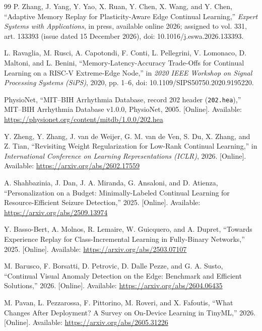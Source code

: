 \begin{thebibliography}{99}
P. Zhang, J. Yang, Y. Yao, X. Ruan, Y. Chen, X. Wang, and Y. Chen,
``Adaptive Memory Replay for Plasticity-Aware Edge Continual Learning,''
\emph{Expert Systems with Applications}, in press, available online 2026;
assigned to vol. 331, art. 133393 (issue dated 15 December 2026),
doi: 10.1016/j.eswa.2026.133393.

L. Ravaglia, M. Rusci, A. Capotondi, F. Conti, L. Pellegrini, V. Lomonaco,
D. Maltoni, and L. Benini,
``Memory-Latency-Accuracy Trade-Offs for Continual Learning on a RISC-V
Extreme-Edge Node,'' in \emph{2020 IEEE Workshop on Signal Processing Systems
(SiPS)}, 2020, pp. 1--6, doi: 10.1109/SIPS50750.2020.9195220.

PhysioNet, ``MIT--BIH Arrhythmia Database, record 202 header (\texttt{202.hea}),''
MIT--BIH Arrhythmia Database v1.0.0, PhysioNet, 2005.
[Online]. Available: \url{https://physionet.org/content/mitdb/1.0.0/202.hea}

Y. Zheng, Y. Zhang, J. van de Weijer, G. M. van de Ven, S. Du, X. Zhang, and
Z. Tian, ``Revisiting Weight Regularization for Low-Rank Continual Learning,''
in \emph{International Conference on Learning Representations (ICLR)}, 2026.
[Online]. Available: \url{https://arxiv.org/abs/2602.17559}

A. Shahbazinia, J. Dan, J. A. Miranda, G. Ansaloni, and D. Atienza,
``Personalization on a Budget: Minimally-Labeled Continual Learning for
Resource-Efficient Seizure Detection,'' 2025.
[Online]. Available: \url{https://arxiv.org/abs/2509.13974}

Y. Basso-Bert, A. Molnos, R. Lemaire, W. Guicquero, and A. Dupret,
``Towards Experience Replay for Class-Incremental Learning in Fully-Binary
Networks,'' 2025.
[Online]. Available: \url{https://arxiv.org/abs/2503.07107}

M. Barusco, F. Borsatti, D. Petrovic, D. Dalle Pezze, and G. A. Susto,
``Continual Visual Anomaly Detection on the Edge: Benchmark and Efficient
Solutions,'' 2026.
[Online]. Available: \url{https://arxiv.org/abs/2604.06435}

M. Pavan, L. Pezzarossa, F. Pittorino, M. Roveri, and X. Fafoutis,
``What Changes After Deployment? A Survey on On-Device Learning in TinyML,''
2026. [Online]. Available: \url{https://arxiv.org/abs/2605.31226}

\end{thebibliography}
